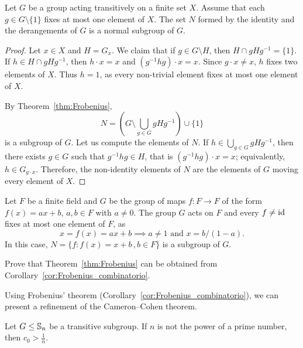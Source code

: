 \begin{corollary}[Frobenius]
    \label{cor:Frobenius_combinatorio}
    Let $G$ be a group acting transitively on a finite set $X$. 
    Assume that each $g\in G\setminus\{1\}$ fixes 
    at most one element of 
     $X$. The set $N$ formed by the identity and the derangements 
     of $G$ is a normal subgroup of $G$.
\end{corollary}

\begin{proof}
  Let $x\in X$ and $H=G_x$. We claim that 
  if $g\in G\setminus H$, then $H\cap
  gHg^{-1}=\{1\}$. If $h\in H\cap gHg^{-1}$, then
  $h\cdot x=x$ and $(g^{-1}hg)\cdot
  x=x$. Since $g\cdot x\ne x$, $h$ fixes two elements of
  $X$. Thus 
  $h=1$, as every non-trivial element fixes at most one element of $X$. 

  By Theorem~\ref{thm:Frobenius}, 
  \[
    N=\left(G\setminus\bigcup_{g\in G}gHg^{-1}\right)\cup\{1\}
  \]
  is a subgroup of $G$. Let us compute the elements of $N$. If 
  $h\in\bigcup_{g\in G}gHg^{-1}$, then there exists  $g\in G$ such that $g^{-1}hg\in H$,
  that is $(g^{-1}hg)\cdot x=x$; equivalently, 
  $h\in G_{g\cdot x}$. Therefore, the 
  non-identity elements of $N$ are the elements of $G$
  moving every element of $X$.
\end{proof}

\begin{example}
  Let $F$ be a finite field and $G$ be the group of maps 
  $f\colon F\to F$ of the form 
  $f(x)=ax+b$, $a,b\in F$ with $a\ne0$. The group $G$ acts on 
  $F$ and every 
  $f\ne\operatorname{id}$ fixes at most one element of $F$, as 
  \[
	x=f(x)=ax+b\implies a\ne 1\text{ and } x=b/(1-a).
  \]
  In this case, $N=\{f:f(x)=x+b\,,b\in F\}$ 
  is a subgroup of $G$.
\end{example}

\begin{exercise}
    Prove that Theorem~\ref{thm:Frobenius} can be obtained from
    Corollary~\ref{cor:Frobenius_combinatorio}.
\end{exercise}

Using Frobenius’ theorem (Corollary~\ref{cor:Frobenius_combinatorio}), we can present a refinement of the Cameron–Cohen theorem.


\begin{theorem}
\label{thm:CameronCohen>1/n}
    Let $G\leq\mathbb{S}_n$ be a transitive subgroup. 
    If $n$ is not the power of a prime number, then
    $c_0>\frac{1}{n}$. 
\end{theorem}

